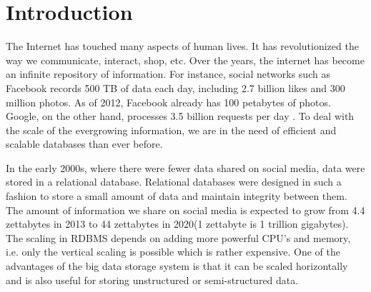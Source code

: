 \documentclass[11pt,a4paper,bibtotoc,idxtotoc,headsepline,footsepline,footexclude,BCOR12mm,DIV13]{scrbook}
\begin{document}
	\frontmatter
	
	
	
	
	
	
%	
	\clearemptydoublepage
	
	
	
	
	
	
	
	
	

	\tableofcontents
  

	\mainmatter
	
	



\chapter{Introduction}
\label{chap:introduction}


The Internet has touched many aspects of human lives. It has revolutionized the way we communicate, interact, shop, etc. Over the years, the internet has become an infinite repository of information. For instance, social networks such as Facebook records  500 TB of data each day\cite{daniel:datastats}, including 2.7 billion likes and 300 million photos. As of 2012, Facebook already has 100 petabytes of photos\cite{daniel:datastats}. Google, on the other hand, processes 3.5 billion requests per day \cite{daniel:datastats}. To deal with the scale of the evergrowing information, we are in the need of efficient and scalable databases than ever before. 

In the early 2000s, where there were fewer data shared on social media, data were stored in a relational database. Relational databases were designed in such a fashion to store a small amount of data and maintain integrity between them\cite{matt:rdb}. The amount of information we share on social media is expected to grow from 4.4 zettabytes in 2013 to 44 zettabytes in 2020(1 zettabyte is 1 trillion gigabytes)\cite{matt:rdb}. The scaling in RDBMS depends on adding more powerful CPU's and memory, i.e. only the vertical scaling is possible which is rather expensive.  One of the advantages of the big data storage system is that it can be scaled horizontally and is also useful for storing unstructured or semi-structured data. 
\end{document}
